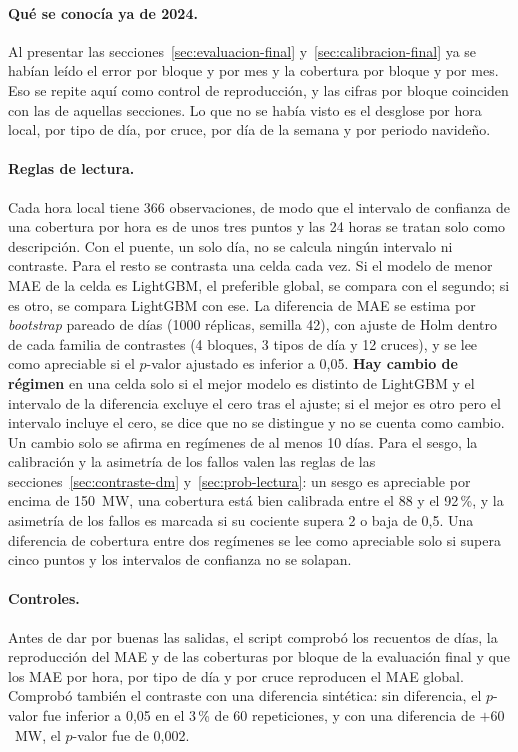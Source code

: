 \paragraph{Qué se conocía ya de 2024.} Al presentar las secciones~\ref{sec:evaluacion-final}
y~\ref{sec:calibracion-final} ya se habían leído el error por bloque y por mes y
la cobertura por bloque y por mes. Eso se repite aquí como control de
reproducción, y las cifras por bloque coinciden con las de aquellas secciones.
Lo que no se había visto es el desglose por hora local, por tipo de día, por
cruce, por día de la semana y por periodo navideño.

\paragraph{Reglas de lectura.} Cada hora local tiene 366 observaciones, de
modo que el intervalo de confianza de una cobertura por hora es de unos tres
puntos y las 24 horas se tratan solo como descripción. Con el puente, un solo
día, no se calcula ningún intervalo ni contraste. Para el resto se contrasta una
celda cada vez. Si el modelo de menor MAE de la celda es LightGBM, el preferible
global, se compara con el segundo; si es otro, se compara LightGBM con ese. La
diferencia de MAE se estima por \textit{bootstrap} pareado de días (1000
réplicas, semilla 42), con ajuste de Holm dentro de cada familia de contrastes
(4 bloques, 3 tipos de día y 12 cruces), y se lee como apreciable si el
$p$-valor ajustado es inferior a 0,05. \textbf{Hay cambio de régimen} en una
celda solo si el mejor modelo es distinto de LightGBM y el intervalo de la
diferencia excluye el cero tras el ajuste; si el mejor es otro pero el
intervalo incluye el cero, se dice que no se distingue y no se cuenta como
cambio. Un cambio solo se afirma en regímenes de al menos 10 días. Para el
sesgo, la calibración y la asimetría de los fallos valen las reglas de las
secciones~\ref{sec:contraste-dm} y~\ref{sec:prob-lectura}: un sesgo es apreciable
por encima de 150~MW, una cobertura está bien calibrada entre el 88 y el
92\,\%, y la asimetría de los fallos es marcada si su cociente supera 2 o baja
de 0,5. Una diferencia de cobertura entre dos regímenes se lee como apreciable
solo si supera cinco puntos y los intervalos de confianza no se solapan.

\paragraph{Controles.} Antes de dar por buenas las salidas, el script comprobó
los recuentos de días, la reproducción del MAE y de las coberturas por bloque
de la evaluación final y que los MAE por hora, por tipo de día y por cruce
reproducen el MAE global. Comprobó también el contraste con una diferencia
sintética: sin diferencia, el $p$-valor fue inferior a 0,05 en el 3\,\% de 60
repeticiones, y con una diferencia de $+60$~MW, el $p$-valor fue de 0,002.

